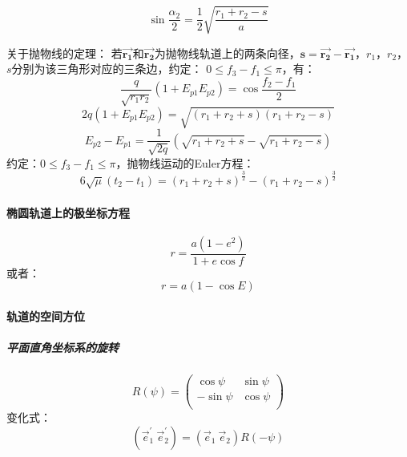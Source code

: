 \begin{equation}
	\sin \frac{\alpha_{2}}{2}=\frac{1}{2}\sqrt{\frac{r_{1}+r_{2}-s}{a}}
\end{equation}

关于抛物线的定理：
若$\vec{\mathbf{r_{1}}}$和$\vec{\mathbf{r_{2}}}$为抛物线轨道上的两条向径，$\mathbf{s}=\vec{\mathbf{r_{2}}}-\vec{\mathbf{r_{1}}}$，$r_{1}$，$r_{2}$，$s$分别为该三角形对应的三条边，约定：
$0 \leq f_{3}-f_{1} \leq \pi$，有：
\begin{equation}
	\frac{q}{\sqrt{r_{1}r_{2}}}\left(1+E_{p1}E_{p2}\right)=\cos \frac{f_{2}-f_{1}}{2}
\end{equation}
\begin{equation}
	2q\left(1+E_{p1}E_{p2}\right)=\sqrt{\left(r_{1}+r_{2}+s\right)\left(r_{1}+r_{2}-s\right)}
\end{equation}
\begin{equation}
	E_{p2}-E_{p1}=\frac{1}{\sqrt{2q}}\left(\sqrt{r_{1}+r_{2}+s}-\sqrt{r_{1}+r_{2}-s}\right)
\end{equation}
约定：$0\leq f_{3}-f_{1}\leq \pi $，抛物线运动的Euler方程：
\begin{equation}
	6\sqrt{\mu}(t_{2}-t_{1})=(r_{1}+r_{2}+s)^{\frac{3}{2}}-(r_{1}+r_{2}-s)^{\frac{3}{2}}
\end{equation}
\paragraph{椭圆轨道上的极坐标方程}
\begin{equation}
	r =\frac{a(1-e^2)}{1+e\cos f}
\end{equation}
或者：
\begin{equation}
	r = a(1-\cos E)
\end{equation}
\paragraph{轨道的空间方位}
\subparagraph{平面直角坐标系的旋转}
\begin{equation}
	R(\psi)=\begin{pmatrix}
		\cos \psi&\sin \psi \\
		-\sin \psi &\cos \psi \\
	\end{pmatrix}
\end{equation}
变化式：
\begin{equation}
	(\vec e_{1}^\prime \ \vec e_{2}^\prime)=(\vec e_{1} \ \vec e_{2})R(-\psi)
\end{equation}

